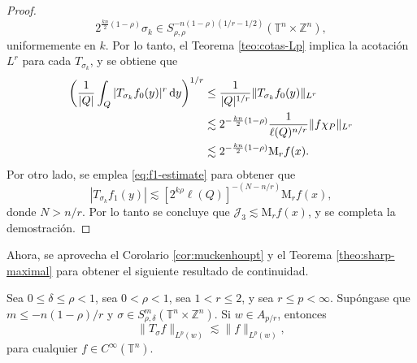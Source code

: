 \begin{proof}
\begin{equation*}
	2^{\frac{kn}{2}(1-\rho)}\sigma_k \in S_{\rho, \rho}^{-n(1-\rho)(1/r-1/2)} (\mathbb{T}^n \times \mathbb{Z}^n),
\end{equation*}
uniformemente en $k$. Por lo tanto, el Teorema \ref{teo:cotas-Lp} implica la acotación $L^r$ para cada $T_{\sigma_k}$, y se obtiene que
\begin{align*}
	\left( \frac{1}{|Q|}\int_Q |T_{\sigma_k}f_0(y)|^r \mathop{}\!\mathrm{d} y
	\right)^{1/r} & \leq \frac{1}{|Q|^{1/r}} \|T_{\sigma_k}f_0(y)\|_{L^r} \\
	& \lesssim 2^{-\frac{kn}{2}(1-\rho)} \frac{1}{\ell(Q)^{n/r}} \|f\chi_P\|_{L^r} \\
	& \lesssim2^{-\frac{kn}{2}(1-\rho)} \mathrm{M}_rf(x).
\end{align*}
Por otro lado, se emplea \cref{eq:f1-estimate} para obtener que
\begin{equation*}
	|T_{\sigma_k}f_1(y)| \lesssim[2^{k\rho}\ell(Q)]^{-(N-n/r)} \mathrm{M}_rf(x),
\end{equation*}
donde $N>n/r$. Por lo tanto se concluye que $\mathcal{J}_3 \lesssim\mathrm{M}_rf(x)$, y se completa la demostración.
\end{proof}
Ahora, se aprovecha el Corolario \cref{cor:muckenhoupt} y el Teorema \ref{theo:sharp-maximal} para obtener el siguiente resultado de continuidad.
\begin{corollary}
Sea $0\leq \delta \leq \rho < 1$, sea $0<\rho<1$, sea $1<r\leq 2$, y sea $r\leq p < \infty$. Supóngase que $m\leq -n(1-\rho)/r$ y $\sigma\in S^m_{\rho,\delta}(\mathbb{T}^n\times\mathbb{Z}^n)$. Si $w \in A_{p/r}$, entonces 
\begin{equation*}
	\|T_\sigma f\|_{L^p(w)} \lesssim\|f\|_{L^p(w)},
\end{equation*}
para cualquier $f\in C^\infty(\mathbb{T}^n)$.
\end{corollary}
